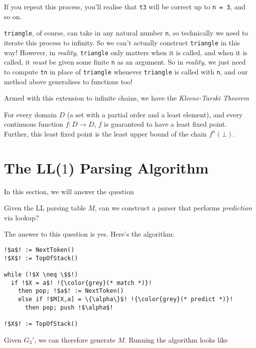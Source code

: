 If you repeat this process, you'll realise that \texttt{t3} will be correct up to \texttt{n = 3}, and so on.

\texttt{triangle}, of course, can take in any natural number \texttt{n}, so technically we need to iterate this process to infinity. So we can't actually construct \texttt{triangle} in this way! However, in \textit{reality}, \texttt{triangle} only matters when it is called, and when it is called, it \textit{must} be given some finite \texttt{n} as an argument. So in \textit{reality}, we just need to compute \texttt{tn} in place of \texttt{triangle} whenever \texttt{triangle} is called with \texttt{n}, and our method above generalises to functions too!

Armed with this extension to infinite chains, we have the \textit{Kleene-Tarski Theorem}

\begin{theorem}
    For every domain $D$ (a set with a partial order and a least element), and every continuous function $f: D \rightarrow D$, $f$ is guaranteed to have a least fixed point. Further, this least fixed point is the least upper bound of the chain $f^n(\bot)$.
\end{theorem}


\section{The LL($1$) Parsing Algorithm}\label{section:running-the-table-driven-parser}
In this section, we will answer the question
\begin{center}
    Given the LL parsing table $M$, can we construct a parser that performs \textit{prediction} via lookup?
\end{center}

The answer to this question is yes. Here's the algorithm:

\begin{lstlisting}[style=pseudocode]
!$a$! := NextToken()
!$X$! := TopOfStack()

while (!$X \neq \$$!)
  if !$X = a$! !{\color{grey}(* match *)}!
    then pop; !$a$! := NextToken()
    else if !$M[X,a] = \{\alpha\}$! !{\color{grey}(* predict *)}!
      then pop; push !$\alpha$!
      
!$X$! := TopOfStack()
\end{lstlisting}

Given $G_3'$, we can therefore generate $M$. Running the algorithm looks like

